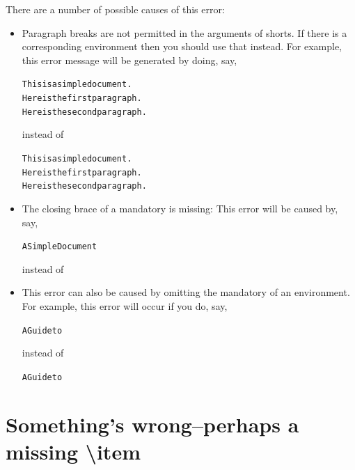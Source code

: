 There are a number of possible causes of this error:

\begin{itemize}

\item Paragraph breaks are not permitted in the
\glspl{argument} of \glspl{short}.
If there is a corresponding \gls{environment} then you
should use that instead.  For example, this error message will be
generated by doing, say,
\begin{alltt}
This is a simple document.
Here is the first paragraph.
\wrong
Here is the second paragraph.
\end{alltt}
instead of\bookpagebreak
\begin{alltt}
This is a simple document.
Here is the first paragraph.
\correct
Here is the second paragraph.
\end{alltt}

\item The closing brace of a 
\gls{mandatory} is missing:
This error will be caused by, say,
\begin{alltt}\wrong
{}A Simple Document
\end{alltt}
instead of
\begin{alltt}\correct
{}
\end{alltt}

\item This error can also be caused by omitting the 
\gls{mandatory} of an \gls{environment}.  For example, 
this error will occur
if you do, say,
\begin{alltt}\wrong
{}
 A Guide to 
\end{alltt}
instead of
\begin{alltt}\correct
{}
 A Guide to 
\end{alltt}

\end{itemize}


\section{Something's wrong--perhaps a missing \textbackslash item}

